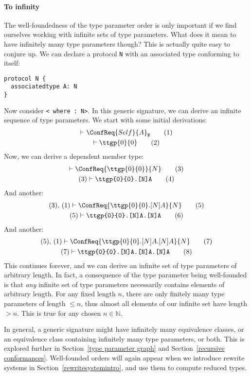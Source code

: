 \documentclass[../generics]{subfiles}
\begin{document}
\paragraph{To infinity} The well-foundedness of the type parameter order is only important if we find ourselves working with infinite sets of type parameters. What does it mean to have infinitely many type parameters though? This is actually quite easy to conjure up. We can declare a protocol \texttt{N} with an associated type conforming to itself:
\begin{Verbatim}
protocol N {
  associatedtype A: N
}
\end{Verbatim}
Now consider \texttt{< where :~N>}. In this generic signature, we can derive an infinite sequence of type parameters. We start with some initial derivations:
\begin{gather}
\vdash\ConfReq{Self}{A}_\texttt{N}\tag{1}\\
\vdash\ttgp{0}{0}\tag{2}
\end{gather}
Now, we can derive a dependent member type:
\begin{gather}
\vdash\ConfReq{\ttgp{0}{0}}{N}\tag{3}\\
(3)\vdash\texttt{\ttgp{0}{0}.[N]A}\tag{4}
\end{gather}
And another:
\begin{gather}
(3),\,(1)\vdash\ConfReq{\ttgp{0}{0}.[N]A}{N}\tag{5}\\
(5)\vdash\texttt{\ttgp{0}{0}.[N]A.[N]A}\tag{6}
\end{gather}
And another:
\begin{gather}
(5),\,(1)\vdash\ConfReq{\ttgp{0}{0}.[N]A.[N]A}{N}\tag{7}\\
(7)\vdash\texttt{\ttgp{0}{0}.[N]A.[N]A.[N]A}\tag{8}
\end{gather}
This continues forever, and we can derive an infinite set of type parameters of arbitrary length. In fact, a consequence of the type parameter being well-founded is that \emph{any} infinite set of type parameters necessarily contains elements of arbitrary length. For any fixed length $n$, there are only finitely many type parameters of length $\le n$, thus almost all elements of our infinite set have length $> n$. This is true for any chosen $n\in\mathbb{N}$.

In general, a generic signature might have infinitely many equivalence classes, or an equivalence class containing infinitely many type parameters, or both. This is explored further in Section~\ref{type parameter graph} and Section~\ref{recursive conformances}. Well-founded orders will again appear when we introduce rewrite systems in Section~\ref{rewritesystemintro}, and use them to compute reduced types.
\end{document}
